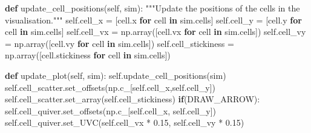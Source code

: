 \documentclass[
  letterpaper,
  DIV=11,
  numbers=noendperiod]{scrreprt}
\newenvironment{Shaded}{\begin{snugshade}}{\end{snugshade}}
\newcommand{\CommentTok}[1]{\textcolor[rgb]{0.37,0.37,0.37}{#1}}
\newcommand{\ControlFlowTok}[1]{\textcolor[rgb]{0.00,0.23,0.31}{\textbf{#1}}}
\newcommand{\FloatTok}[1]{\textcolor[rgb]{0.68,0.00,0.00}{#1}}
\newcommand{\KeywordTok}[1]{\textcolor[rgb]{0.00,0.23,0.31}{\textbf{#1}}}
\newcommand{\NormalTok}[1]{\textcolor[rgb]{0.00,0.23,0.31}{#1}}
\newcommand{\OperatorTok}[1]{\textcolor[rgb]{0.37,0.37,0.37}{#1}}
\newcommand{\VariableTok}[1]{\textcolor[rgb]{0.07,0.07,0.07}{#1}}
\theoremstyle{definition}
\theoremstyle{remark}
\begin{document}
\begin{tcolorbox}
\begin{Shaded}
\begin{Highlighting}[]
    \KeywordTok{def}\NormalTok{ update\_cell\_positions(}\VariableTok{self}\NormalTok{, sim):}
        \CommentTok{"""Update the positions of the cells in the visualisation."""}
        \VariableTok{self}\NormalTok{.cell\_x }\OperatorTok{=}\NormalTok{ [cell.x }\ControlFlowTok{for}\NormalTok{ cell }\KeywordTok{in}\NormalTok{ sim.cells]}
        \VariableTok{self}\NormalTok{.cell\_y }\OperatorTok{=}\NormalTok{ [cell.y }\ControlFlowTok{for}\NormalTok{ cell }\KeywordTok{in}\NormalTok{ sim.cells]}
        \VariableTok{self}\NormalTok{.cell\_vx }\OperatorTok{=}\NormalTok{ np.array([cell.vx }\ControlFlowTok{for}\NormalTok{ cell }\KeywordTok{in}\NormalTok{ sim.cells])}
        \VariableTok{self}\NormalTok{.cell\_vy }\OperatorTok{=}\NormalTok{ np.array([cell.vy }\ControlFlowTok{for}\NormalTok{ cell }\KeywordTok{in}\NormalTok{ sim.cells])}
        \VariableTok{self}\NormalTok{.cell\_stickiness }\OperatorTok{=}\NormalTok{ np.array([cell.stickiness }\ControlFlowTok{for}\NormalTok{ cell }\KeywordTok{in}\NormalTok{ sim.cells])}
    
    \KeywordTok{def}\NormalTok{ update\_plot(}\VariableTok{self}\NormalTok{, sim):}
        \VariableTok{self}\NormalTok{.update\_cell\_positions(sim)}
        \VariableTok{self}\NormalTok{.cell\_scatter.set\_offsets(np.c\_[}\VariableTok{self}\NormalTok{.cell\_x,}\VariableTok{self}\NormalTok{.cell\_y])}
        \VariableTok{self}\NormalTok{.cell\_scatter.set\_array(}\VariableTok{self}\NormalTok{.cell\_stickiness)}
        \ControlFlowTok{if}\NormalTok{(DRAW\_ARROW): }
            \VariableTok{self}\NormalTok{.cell\_quiver.set\_offsets(np.c\_[}\VariableTok{self}\NormalTok{.cell\_x, }\VariableTok{self}\NormalTok{.cell\_y])}
            \VariableTok{self}\NormalTok{.cell\_quiver.set\_UVC(}\VariableTok{self}\NormalTok{.cell\_vx }\OperatorTok{*} \FloatTok{0.15}\NormalTok{, }\VariableTok{self}\NormalTok{.cell\_vy }\OperatorTok{*} \FloatTok{0.15}\NormalTok{)        }


\end{Highlighting}
\end{Shaded}
\end{tcolorbox}
\end{document}
